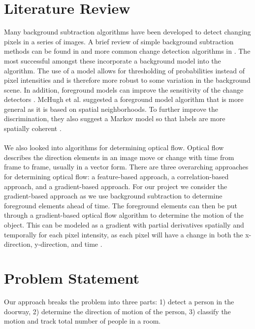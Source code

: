 \documentclass[12pt,oneside]{article} %
\begin{document}
\section{Literature Review}  %
Many background subtraction algorithms have been developed to detect changing pixels in a series of images.
A brief review of simple background subtraction methods can be found in \cite{Piccardi04} and
more common change detection algorithms in \cite{Goyette14}.
The most successful amongst these incorporate a background model into the algorithm. The use of a model
allows for thresholding of probabilities instead of pixel intensities and is therefore more robust to some variation
in the background scene. In addition, foreground models can improve the sensitivity of the change detectors 
\cite{Elgammal02}. McHugh et al. suggested a foreground model algorithm that is more general as it
is based on spatial neighborhoods. To further improve the discrimination, they also suggest a Markov model
so that labels are more spatially coherent
\cite{Mchugh09}.
\\ \\
We also looked into algorithms for determining optical flow. Optical flow describes the direction elements in an image move or change with time from frame to frame, usually in a vector form. There are three overarching approaches for determining optical flow: a feature-based approach, a correlation-based approach, and a gradient-based approach. For our project we consider the gradient-based approach as we use background subtraction to determine foreground elements ahead of time. The foreground elements can then be put through a gradient-based optical flow algorithm to determine the motion of the object. This can be modeled as a gradient with partial derivatives spatially and temporally for each pixel intensity, as each pixel will have a change in both the x-direction, y-direction, and time \cite{Smith97}.

\section{Problem Statement}  %
Our approach breaks the problem into three parts: 1) detect a person in the doorway, 2) determine the direction of 
motion of the person, 3) classify the motion and track total number of people in a room.
\end{document}
